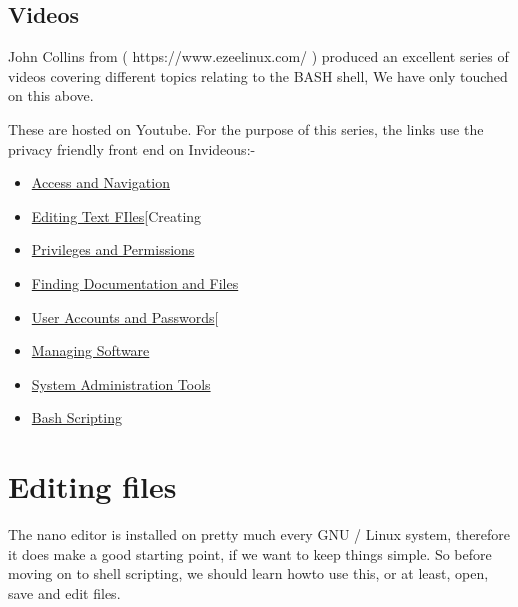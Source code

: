 \documentclass{extbook}
\begin{document}
\subsection{Videos}

John Collins from ( https://www.ezeelinux.com/ ) produced an excellent series of videos covering different topics relating to the BASH shell,  We have only touched on this above.

These are hosted on Youtube.  For the purpose of this series, the links use the privacy friendly front end on Invideous:-

\begin{itemize}
\item \href{https://invidious.snopyta.org/watch?v=eH8Z9zeywq0}{Access and Navigation}  
\item \href{https://invidious.snopyta.org/watch?v=eH8Z9zeywq0}{Editing Text FIles}[Creating 
\item \href{https://invidious.snopyta.org/watch?v=s23NqWKxOXk}{Privileges and Permissions} 
\item \href{https://invidious.snopyta.org/watch?v=4r7V2-EBnR0}{Finding Documentation and Files}
\item \href{https://invidious.snopyta.org/watch?v=XVCf0cou6EU}{User Accounts and Passwords}[ 
\item \href{https://invidious.snopyta.org/watch?v=lNyJllHk2SA}{Managing Software}
\item \href{https://invidious.snopyta.org/watch?v=4\_21KZ3qKEI7}{System Administration Tools}
\item \href{https://invidious.snopyta.org/watch?v=57sp8Y0GL40}{Bash Scripting}
\end{itemize}


\section{Editing files}

The nano editor is installed on pretty much every GNU / Linux system,  therefore it does make a good starting point, if we want to keep things simple.  So before moving on to shell scripting, we should learn howto use this, or at least, open, save and edit files. 

\begin{itemize}
\item \href{https://www.nano-editor.org/}{Nano Editor website}
\item \href{https://www.youtube.com/watch?v=cLyUZAabf40}{Youtube video - beginners guide to nano}}
\item \href{https://www.nano-editor.org/dist/latest/cheatsheet.html}{Nano Cheat sheet} 

\end{itemize}
\end{document}
